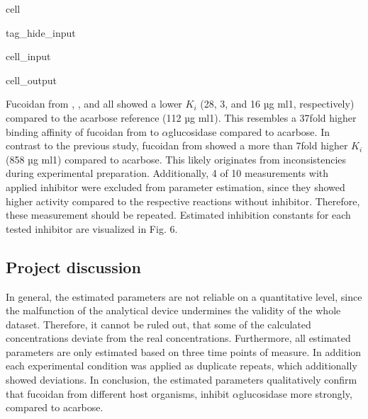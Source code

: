 \documentclass[letterpaper,12pt,english]{jupyterBook}
\begin{document}
\begin{sphinxuseclass}{cell}
\begin{sphinxuseclass}{tag_hide_input}
\begin{sphinxVerbatimInput}
\begin{sphinxuseclass}{cell_input}
\end{sphinxuseclass}\end{sphinxVerbatimInput}
\begin{sphinxVerbatimOutput}

\begin{sphinxuseclass}{cell_output}
\noindent{}

\end{sphinxuseclass}\end{sphinxVerbatimOutput}

\end{sphinxuseclass}
\end{sphinxuseclass}
\sphinxAtStartPar
{}

\sphinxAtStartPar
Fucoidan from , , and  all showed a lower \(K_{i}\) (28, 3, and 16 µg ml\sphinxhyphen{}1, respectively) compared to the acarbose reference (112 µg ml\sphinxhyphen{}1). This resembles a 37\sphinxhyphen{}fold higher binding affinity of fucoidan from  to \(\alpha\)\sphinxhyphen{}glucosidase compared to acarbose. In contrast to the previous study, fucoidan from  showed a more than 7\sphinxhyphen{}fold higher \(K_{i}\) (858 µg ml\sphinxhyphen{}1) compared to acarbose. This likely originates from inconsistencies during experimental preparation. Additionally, 4 of 10 measurements with applied inhibitor were excluded from parameter estimation, since they showed higher activity compared to the respective reactions without inhibitor. Therefore, these measurement should be repeated. Estimated inhibition constants for each tested inhibitor are visualized in Fig. 6.


\subsection{Project discussion}
\label{\detokenize{scenarios/glycosidase_inhibition:project-discussion}}
\sphinxAtStartPar
In general, the estimated parameters are not reliable on a quantitative level, since the malfunction of the analytical device undermines the validity of the whole dataset. Therefore, it cannot be ruled out, that some of the calculated concentrations deviate from the real concentrations. Furthermore, all estimated parameters are only estimated based on three time points of measure. In addition each experimental condition was applied as duplicate repeats, which additionally showed deviations.
In conclusion, the estimated parameters qualitatively confirm that fucoidan from different host organisms, inhibit \(\alpha\)\sphinxhyphen{}glucosidase more strongly, compared to acarbose.
\end{document}
